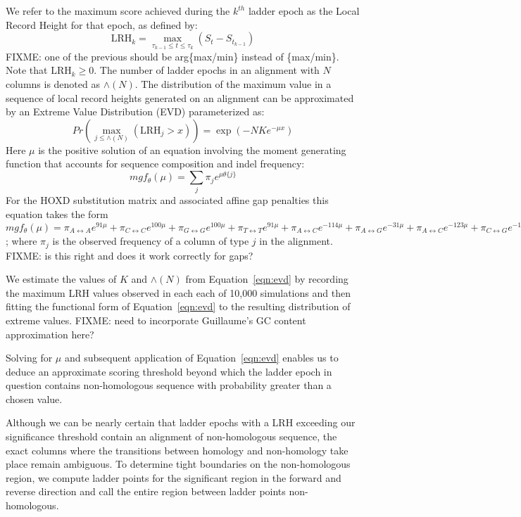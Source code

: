 \documentclass[twoside,11pt]{article}
\begin{document}
We refer to the maximum score achieved during the $k^{th}$ ladder epoch as the Local Record Height for that epoch, as defined by:
\begin{equation}
\mathrm{LRH}_k = \max_{\tau_{k-1}\leq t \leq \tau_k}(S_t - S_{t_{k-1}})
\end{equation}
FIXME: one of the previous should be arg\{max/min\} instead of \{max/min\}.  Note that $\mathrm{LRH}_k \geq 0$.  The number of ladder epochs in an alignment with $N$ columns is denoted as $\wedge(N)$.  The distribution of the maximum value in a sequence of local record heights generated on an alignment can be approximated by an Extreme Value Distribution (EVD) parameterized as:
\begin{equation}
\label{eqn:evd}
Pr(\max_{j \leq \wedge(N)}(\mathrm{LRH}_j > x)) = \exp(-NKe^{-\mu x})
\end{equation}
Here $\mu$ is the positive solution of an equation involving the moment generating function that accounts for sequence composition and indel frequency:
\begin{equation}
mgf_\theta(\mu) = \sum_j \pi_j e^{\mu \theta\{j\}}
\end{equation}
For the HOXD substitution matrix and associated affine gap penalties this equation takes the form $mgf_\theta(\mu) = \pi_{A\leftrightarrow A}e^{91\mu} + \pi_{C\leftrightarrow C}e^{100\mu} + \pi_{G\leftrightarrow G}e^{100\mu} + \pi_{T\leftrightarrow T}e^{91\mu} + \pi_{A\leftrightarrow C}e^{-114\mu} + \pi_{A\leftrightarrow G}e^{-31\mu} + \pi_{A\leftrightarrow C}e^{-123\mu} + \pi_{C\leftrightarrow G}e^{-125\mu} + \pi_{C\leftrightarrow T}e^{-31\mu} +  \pi_{G\leftrightarrow T}e^{-114\mu} + \pi_{gapopen}e^{-400\mu} + \pi_{gapext}e^{-35\mu}$; where $\pi_j$ is the observed frequency of a column of type $j$ in the alignment.  FIXME: is this right and does it work correctly for gaps?

We estimate the values of $K$ and $\wedge(N)$ from Equation~\ref{eqn:evd} by recording the maximum LRH values observed in each each of 10,000 simulations and then fitting the functional form of Equation~\ref{eqn:evd} to the resulting distribution of extreme values.  FIXME: need to incorporate Guillaume's GC content approximation here?

Solving for $\mu$ and subsequent application of Equation~\ref{eqn:evd} enables us to deduce an approximate scoring threshold beyond which the ladder epoch in question contains non-homologous sequence with probability greater than a chosen value.

Although we can be nearly certain that ladder epochs with a LRH exceeding our significance threshold contain an alignment of non-homologous sequence, the exact columns where the transitions between homology and non-homology take place remain ambiguous.  To determine tight boundaries on the non-homologous region, we compute ladder points for the significant region in the forward and reverse direction and call the entire region between ladder points non-homologous.
\end{document}
